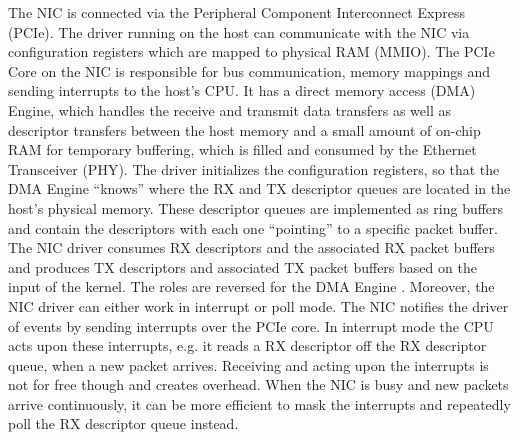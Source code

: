 The NIC is connected via the Peripheral Component Interconnect Express (PCIe). The driver running on the host can communicate with the NIC via configuration registers which are mapped to physical RAM (MMIO). The PCIe Core on the NIC is responsible for bus communication, memory mappings and sending interrupts to the host’s CPU. It has a direct memory access (DMA) Engine, which handles the receive and transmit data transfers as well as descriptor transfers between the host memory and a small amount of on-chip RAM for temporary buffering, which is filled and consumed by the Ethernet Transceiver (PHY). The driver initializes the configuration registers, so that the DMA  Engine “knows” where the RX and TX descriptor queues are located in the host’s physical memory. These descriptor queues are implemented as ring buffers and contain the descriptors with each one “pointing” to a specific packet buffer. The NIC driver consumes RX descriptors and the associated RX packet buffers and produces TX descriptors and associated TX packet buffers based on the input of the kernel. The roles are reversed for the DMA  Engine \cite{intel:8256}. \newline
Moreover, the NIC driver can either work in interrupt or poll mode. The NIC notifies the driver of events by sending interrupts over the PCIe core. In interrupt mode the CPU acts upon these interrupts, e.g. it reads a RX descriptor off the RX descriptor queue, when a new packet arrives. Receiving and acting upon the interrupts is not for free though and creates overhead. When the NIC is busy and new packets arrive continuously, it can be more efficient to mask the interrupts and repeatedly poll the RX descriptor queue instead.

